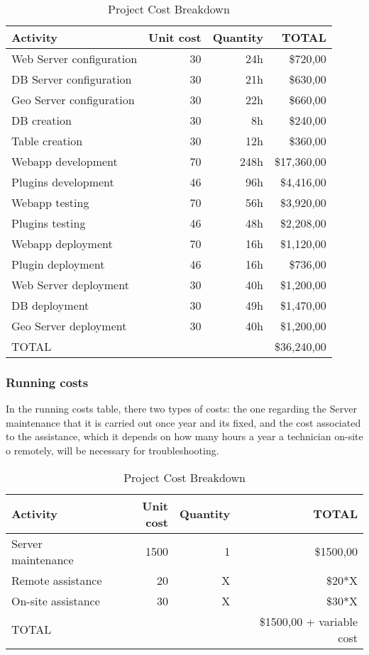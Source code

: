 \begin{table}[htbp]
    \centering
    \caption{Project Cost Breakdown} 
    \begin{tabular}{lrrr}
        \toprule
        Activity & Unit cost & Quantity & TOTAL \\
        \midrule
        Web Server configuration & 30 & 24h & \$720,00 \\
        DB Server configuration & 30 & 21h & \$630,00 \\
        Geo Server configuration & 30 & 22h & \$660,00 \\
        DB creation & 30 & 8h & \$240,00 \\
        Table creation & 30 & 12h & \$360,00 \\
        Webapp development & 70 & 248h & \$17,360,00 \\
        Plugins development & 46 & 96h & \$4,416,00 \\
        Webapp testing & 70 & 56h & \$3,920,00 \\
        Plugins testing & 46 & 48h & \$2,208,00 \\
        Webapp deployment & 70 & 16h & \$1,120,00 \\
        Plugin deployment & 46 & 16h & \$736,00 \\
        Web Server deployment & 30 & 40h & \$1,200,00 \\
        DB deployment & 30 & 49h & \$1,470,00 \\
        Geo Server deployment & 30 & 40h & \$1,200,00 \\
        \midrule
        TOTAL & & & \$36,240,00 \\
        \bottomrule
    \end{tabular}
\end{table}

\newpage 

\subsubsection{Running costs}
In the running costs table, there two types of costs: the one regarding the Server maintenance that it is carried out once year and its fixed, and the cost associated to the assistance, which it depends on how many hours a year a technician on-site o remotely, will be necessary for troubleshooting.
\begin{table}[htbp]
    \centering
    \caption{Project Cost Breakdown} 
    \begin{tabular}{lrrr}
        \toprule
        Activity & Unit cost & Quantity & TOTAL \\
        \midrule
        Server maintenance & 1500 & 1 & \$1500,00 \\
        Remote assistance & 20 & X & \$20*X \\
        On-site assistance & 30 & X & \$30*X \\
        \midrule
        TOTAL & & & \$1500,00 + variable cost \\
        \bottomrule
    \end{tabular}
\end{table}